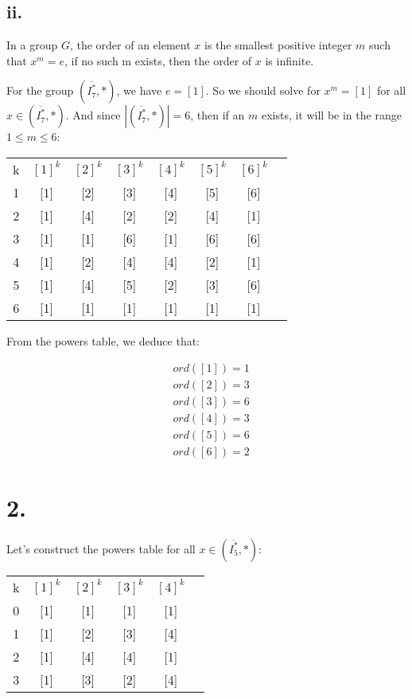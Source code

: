 \documentclass{article}
\begin{document}
\subsection*{ii.}
In a group $G$, the order of an element $x$ is the smallest positive integer $m$ such that $x^m = e$, if no such m exists, then the order of $x$ is infinite.
\newline

\noindent
For the group $(\overline{I_7^*}, *)$, we have $e = [1]$. So we should solve for $x^m = [1]$ for all $x \in (\overline{I_7^*}, *)$. And since $|(\overline{I_7^*}, *)| = 6$, then if an $m$ exists, it will be in the range $1 \leq m \leq 6$:
\newline

\begin{tabular}{c | c c c c c c c}
  k & $[1]^k$ & $[2]^k$ & $[3]^k$ & $[4]^k$& $[5]^k$& $[6]^k$ \\
  \cline{1-7}
  1 & [1] & [2] & [3] & [4] & [5] & [6] \\
  2 & [1] & [4] & [2] & [2] & [4] & [1] \\
  3 & [1] & [1] & [6] & [1] & [6] & [6] \\
  4 & [1] & [2] & [4] & [4] & [2] & [1] \\
  5 & [1] & [4] & [5] & [2] & [3] & [6] \\
  6 & [1] & [1] & [1] & [1] & [1] & [1] \\
\end{tabular}

From the powers table, we deduce that:

\begin{align*}
  &ord([1]) = 1  \\
  &ord([2]) = 3 \\
  &ord([3]) = 6 \\
  &ord([4]) = 3 \\
  &ord([5]) = 6 \\
  &ord([6]) = 2
\end{align*}

\section*{2.}

Let's construct the powers table for all $x \in (\overline{I_5^*}, *)$:
\newline

\begin{tabular}{c | c c c c c}
  k & $[1]^k$ & $[2]^k$ & $[3]^k$ & $[4]^k$ \\
  \cline{1-5}
  0 & [1] & [1] & [1] & [1] \\
  1 & [1] & [2] & [3] & [4] \\
  2 & [1] & [4] & [4] & [1] \\
  3 & [1] & [3] & [2] & [4] \\
\end{tabular}
\newline
\end{document}
